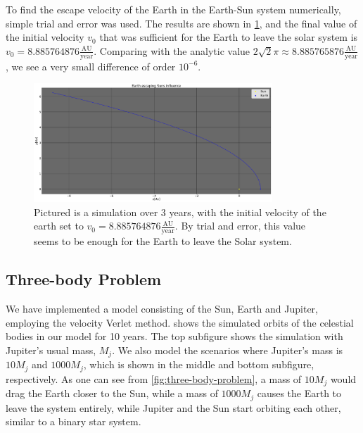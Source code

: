 \documentclass[../main.tex]{subfiles}
\begin{document}
To find the escape velocity of the Earth in the Earth-Sun system numerically, simple trial and error was used. The results are shown in \cref{fig:earth-escape-velocity}, and the final value of the initial velocity $v_0$ that was sufficient for the Earth to leave the solar system is $v_0 = 8.885764876 \frac{\text{AU}}{\text{year}}$. Comparing with the analytic value $2 \sqrt{2} \pi \approx 8.885765876 \frac{\text{AU}}{\text{year}}$, we see a very small difference of order $10^{-6}$.

\begin{figure}[htb!]
    \centering
    \includegraphics[trim=5.cm 0.cm 0.cm 0.cm, clip,width=0.8\textwidth]{../figures/escape.pdf}
    \caption{Pictured is a simulation over 3 years, with the initial velocity of the earth set to $v_0 = 8.885764876 \frac{\text{AU}}{\text{year}}$. By trial and error, this value seems to be enough for the Earth to leave the Solar system.}
    \label{fig:earth-escape-velocity}
\end{figure}

\subsection{Three-body Problem}
We have implemented a model consisting of the Sun, Earth and Jupiter, employing the velocity Verlet method.  shows the simulated orbits of the celestial bodies in our model for 10 years. The top subfigure shows the simulation with Jupiter's usual mass, $M_j$. We also model the scenarios where Jupiter's mass is $10M_j$ and $1000M_j$, which is shown in the middle and bottom subfigure, respectively. As one can see from \cref{fig:three-body-problem}, a mass of $10M_j$ would drag the Earth closer to the Sun, while a mass of $1000M_j$ causes the Earth to leave the system entirely, while Jupiter and the Sun start orbiting each other, similar to a binary star system. 
\end{document}
